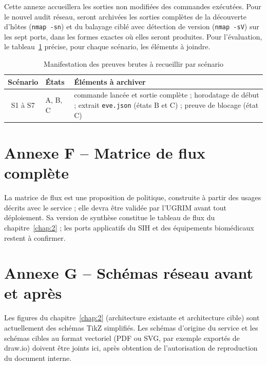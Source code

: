 Cette annexe accueillera les sorties non modifiées des commandes exécutées. Pour le nouvel audit réseau, seront archivées les sorties complètes de la découverte d'hôtes (\texttt{nmap -sn}) et du balayage ciblé avec détection de version (\texttt{nmap -sV}) sur les sept ports, dans les formes exactes où elles seront produites. Pour l'évaluation, le tableau~\ref{tab:preuves} précise, pour chaque scénario, les éléments à joindre.

\begin{table}[htbp]
\centering
\small
\begin{tabularx}{\textwidth}{clX}
\hline
\textbf{Scénario} & \textbf{États} & \textbf{Éléments à archiver} \\
\hline
S1 à S7 & A, B, C & commande lancée et sortie complète ; horodatage de début ; extrait \texttt{eve.json} (états B et C) ; preuve de blocage (état C) \\
\hline
\end{tabularx}
\caption{Manifestation des preuves brutes à recueillir par scénario}
\label{tab:preuves}
\end{table}


\section*{Annexe F -- Matrice de flux complète}

La matrice de flux est une proposition de politique, construite à partir des usages décrits avec le service ; elle devra être validée par l'UGRIM avant tout déploiement. Sa version de synthèse constitue le tableau de flux du chapitre~\ref{chap:2} ; les ports applicatifs du SIH et des équipements biomédicaux restent à confirmer.


\section*{Annexe G -- Schémas réseau avant et après}

Les figures du chapitre~\ref{chap:2} (architecture existante et architecture cible) sont actuellement des schémas TikZ simplifiés. Les schémas d'origine du service et les schémas cibles au format vectoriel (PDF ou SVG, par exemple exportés de draw.io) doivent être joints ici, après obtention de l'autorisation de reproduction du document interne.

